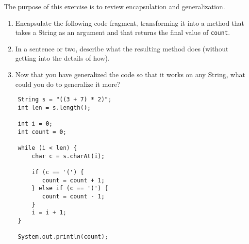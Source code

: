 \begin{exercise}
The purpose of this exercise is to review encapsulation
and generalization.

\begin{enumerate}

\item Encapsulate the following code fragment, transforming it
into a method that takes a String as an argument and that
returns the final value of {\tt count}.

\item In a sentence or two, describe what the resulting method does
(without getting into the details of how).

\item Now that you have generalized the code
so that it works on any String, what could you do to
generalize it more?

\end{enumerate}

\begin{lstlisting}
    String s = "((3 + 7) * 2)";
    int len = s.length();

    int i = 0;
    int count = 0;

    while (i < len) {
        char c = s.charAt(i);

        if (c == '(') {
           count = count + 1;
        } else if (c == ')') {
           count = count - 1;
        }
        i = i + 1;
    }

    System.out.println(count);
\end{lstlisting}
\end{exercise}


